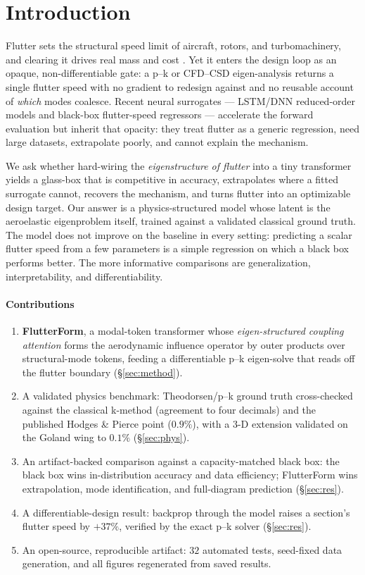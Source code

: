 \documentclass{article}
\begin{document}
\section{Introduction}
Flutter sets the structural speed limit of aircraft, rotors, and turbomachinery,
and clearing it drives real mass and cost \citep{bisplinghoff1955,hodges2011}.
Yet it enters the design loop as an opaque, non-differentiable gate: a p--k or
CFD--CSD eigen-analysis returns a single flutter speed with no gradient to
redesign against and no reusable account of \emph{which} modes coalesce. Recent
neural surrogates --- LSTM/DNN reduced-order models and black-box flutter-speed
regressors \citep{panelflutter2024,transoniclstm2020} --- accelerate the forward
evaluation but inherit that opacity: they treat flutter as a generic regression,
need large datasets, extrapolate poorly, and cannot explain the mechanism.

We ask whether hard-wiring the \emph{eigenstructure of flutter} into a tiny
transformer yields a glass-box that is competitive in accuracy, extrapolates
where a fitted surrogate cannot, recovers the mechanism, and turns flutter into
an optimizable design target. Our answer is a physics-structured model whose
latent is the aeroelastic eigenproblem itself, trained against a validated
classical ground truth. The model does not improve on the baseline in every
setting: predicting a scalar flutter speed from a few parameters is a simple
regression on which a black box performs better. The more informative
comparisons are generalization, interpretability, and differentiability.

\paragraph{Contributions}
\begin{enumerate}\setlength{\itemsep}{1pt}
\item \textbf{FlutterForm}, a modal-token transformer whose \emph{eigen-structured
coupling attention} forms the aerodynamic influence operator by outer products
over structural-mode tokens, feeding a differentiable p--k eigen-solve that reads
off the flutter boundary (\S\ref{sec:method}).
\item A validated physics benchmark: Theodorsen/p--k ground truth cross-checked
against the classical k-method (agreement to four decimals) and the published
Hodges \& Pierce point ($0.9\%$), with a 3-D extension validated on the Goland
wing to $0.1\%$ (\S\ref{sec:phys}).
\item An artifact-backed comparison against a capacity-matched black box:
the black box wins in-distribution accuracy and data efficiency; FlutterForm wins
extrapolation, mode identification, and full-diagram prediction (\S\ref{sec:res}).
\item A differentiable-design result: backprop through the model raises a
section's flutter speed by $+37\%$, verified by the exact p--k solver
(\S\ref{sec:res}).
\item An open-source, reproducible artifact: $32$ automated tests, seed-fixed data
generation, and all figures regenerated from saved results.
\end{enumerate}
\end{document}
